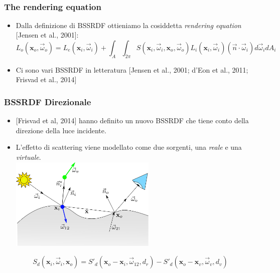 \documentclass{beamer}
\newcommand{\vomega}{\vec{\omega}}
\newcommand{\x}{\mathbf{x}}
\begin{document}
\begin{frame}
\begin{columns}
\begin{column}{0.6\textwidth}
    \end{column}
​  \end{columns}

\end{frame}

\begin{frame}
    \frametitle{The rendering equation}
			\begin{itemize}
				\item Dalla definizione di BSSRDF ottieniamo la cosiddetta \emph{rendering equation} [Jensen et al., 2001]:
				$$L_o(\x_o,\vomega_o) = L_e(\x_i,\vomega_i) + \int_A \int_{2\pi} S(\x_i, \vomega_i, \x_o, \vomega_o) L_i(\x_i,\vomega_i) (\vec{n} \cdot \vomega_i) d\vomega_i d A_i$$
				\item Ci sono vari BSSRDF in letteratura [Jensen et al., 2001; d'Eon et al., 2011; Frisvad et al., 2014]
			\end{itemize}
\end{frame}

\begin{frame}
    \frametitle{BSSRDF Direzionale}
		\vspace{0.3cm}
			\begin{itemize}
				\item {[}Frisvad et al, 2014{]} hanno definito un nuovo BSSRDF che tiene conto della direzione della luce incidente.
				\item L'effetto di scattering viene modellato come due sorgenti, una \emph{reale} e una \emph{virtuale}. \\
				\centering
				\vspace{0.2cm}
				\includegraphics[width=0.55\textwidth]{jeppe}
			\end{itemize}
			$$
			S_d(\x_i, \vomega_i, \x_o) = S'_d(\x_o - \x_i, \vomega_{12}, d_r) - S'_d(\x_o - \x_v, \vomega_{v}, d_v)
			$$
\end{frame}
\end{document}
